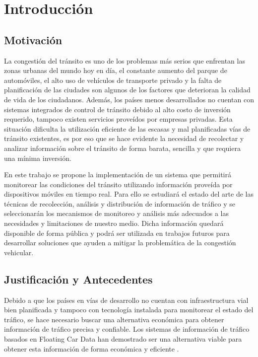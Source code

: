 \chapter{Introducción}

\section{Motivación}

La congestión del tránsito es uno de los problemas más serios que enfrentan las zonas urbanas del mundo hoy en día, el constante aumento del parque de automóviles, el alto uso de vehículos de transporte privado y la falta de planificación de las ciudades son algunos de los factores que deterioran la calidad de vida de los ciudadanos. Además, los países menos desarrollados no cuentan con sistemas integrados de control de tránsito debido al alto costo de inversión requerido, tampoco existen servicios proveídos por empresas privadas. Esta situación dificulta la utilización eficiente de las escasas y mal planificadas vías de tránsito existentes, es por eso que se hace evidente la necesidad de recolectar y analizar información sobre el tránsito de forma barata, sencilla y que requiera una mínima inversión.

En este trabajo se propone la implementación de un sistema que permitirá monitorear las condiciones del tránsito utilizando información proveída por dispositivos móviles en tiempo real. Para ello se estudiará el estado del arte de las técnicas de recolección, análisis y distribución de información de tráfico y se seleccionarán los mecanismos de monitoreo y análisis más adecuados a las necesidades y limitaciones de nuestro medio. Dicha información quedará disponible de forma pública y podrá ser utilizada en trabajos futuros para desarrollar soluciones que ayuden a mitigar la problemática de la congestión vehicular.

\section{Justificación y Antecedentes}

Debido a que los países en vías de desarrollo no cuentan con infraestructura vial bien planificada y tampoco con tecnología 
instalada para monitorear el estado del tráfico, se hace necesario buscar una alternativa económica para obtener información de tráfico precisa y confiable. Los sistemas de información de tráfico basados en Floating Car Data han demostrado ser una alternativa viable para obtener esta información de forma económica y eficiente \cite{schafer2002traffic,reinthaler2007evaluation}.

